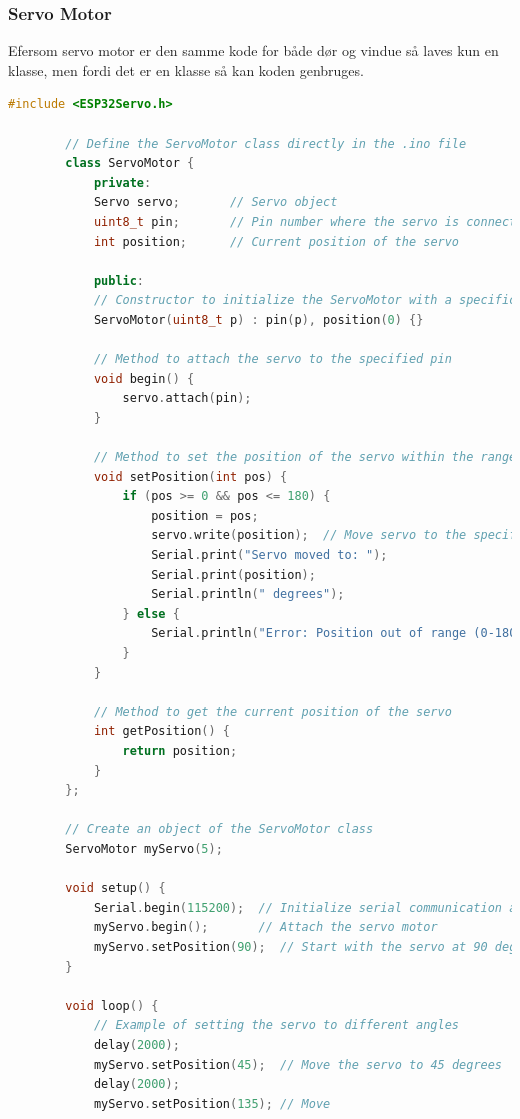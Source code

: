 \documentclass[12pt,a4paper]{book}
\begin{document}
	\subsubsection*{Servo Motor}
	Efersom servo motor er den samme kode for både dør og vindue så laves kun en klasse, men fordi det er en klasse så kan koden genbruges.
	\begin{lstlisting}[language=C++]
		#include <ESP32Servo.h>
		
		// Define the ServoMotor class directly in the .ino file
		class ServoMotor {
			private:
			Servo servo;       // Servo object
			uint8_t pin;       // Pin number where the servo is connected
			int position;      // Current position of the servo
			
			public:
			// Constructor to initialize the ServoMotor with a specific pin
			ServoMotor(uint8_t p) : pin(p), position(0) {}
			
			// Method to attach the servo to the specified pin
			void begin() {
				servo.attach(pin);
			}
			
			// Method to set the position of the servo within the range 0-180 degrees
			void setPosition(int pos) {
				if (pos >= 0 && pos <= 180) {
					position = pos;
					servo.write(position);  // Move servo to the specified position
					Serial.print("Servo moved to: ");
					Serial.print(position);
					Serial.println(" degrees");
				} else {
					Serial.println("Error: Position out of range (0-180)");
				}
			}
			
			// Method to get the current position of the servo
			int getPosition() {
				return position;
			}
		};
		
		// Create an object of the ServoMotor class
		ServoMotor myServo(5);
		
		void setup() {
			Serial.begin(115200);  // Initialize serial communication at 115200 baud rate
			myServo.begin();       // Attach the servo motor
			myServo.setPosition(90);  // Start with the servo at 90 degrees
		}
		
		void loop() {
			// Example of setting the servo to different angles
			delay(2000);
			myServo.setPosition(45);  // Move the servo to 45 degrees
			delay(2000);
			myServo.setPosition(135); // Move 
		\end{lstlisting}
		\clearpage
\end{document}
